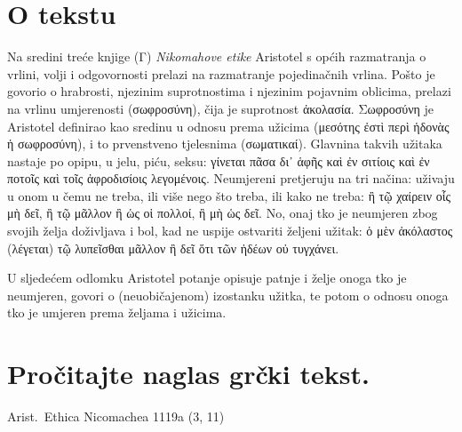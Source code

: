 
\section*{O tekstu}

Na sredini treće knjige (Γ) \textit{Nikomahove etike} Aristotel s općih razmatranja o vrlini, volji i odgovornosti prelazi na razmatranje pojedinačnih vrlina. Pošto je govorio o hrabrosti, njezinim suprotnostima i njezinim pojavnim oblicima, prelazi na vrlinu umjerenosti \textgreek[variant=ancient]{(σωφροσύνη),} čija je suprotnost \textgreek[variant=ancient]{ἀκολασία.  Σωφροσύνη} je Aristotel definirao kao sredinu u odnosu prema užicima \textgreek[variant=ancient]{(μεσότης ἐστὶ περὶ ἡδονὰς ἡ σωφροσύνη),} i to prvenstveno tjelesnima \textgreek[variant=ancient]{(σωματικαί).} Glavnina takvih užitaka nastaje po opipu, u jelu, piću, seksu: \textgreek[variant=ancient]{γίνεται πᾶσα δι᾽ ἁφῆς καὶ ἐν σιτίοις καὶ ἐν ποτοῖς καὶ τοῖς ἀφροδισίοις λεγομένοις.} Neumjereni pretjeruju na tri načina: uživaju u onom u čemu ne treba, ili više nego što treba, ili kako ne treba: \textgreek[variant=ancient]{ἢ τῷ χαίρειν οἷς μὴ δεῖ, ἢ τῷ μᾶλλον ἢ ὡς οἱ πολλοί, ἢ μὴ ὡς δεῖ.} No, onaj tko je neumjeren zbog svojih želja doživljava i bol, kad ne uspije ostvariti željeni užitak: \textgreek[variant=ancient]{ὁ μὲν ἀκόλαστος (λέγεται) τῷ λυπεῖσθαι μᾶλλον ἢ δεῖ ὅτι τῶν ἡδέων οὐ τυγχάνει.}

U sljedećem odlomku Aristotel potanje opisuje patnje i želje onoga tko je neumjeren, govori o (neuobičajenom) izostanku užitka, te potom o odnosu onoga tko je umjeren prema željama i užicima.


\section*{Pročitajte naglas grčki tekst.}

Arist.\ Ethica Nicomachea 1119a (3, 11)


\medskip


